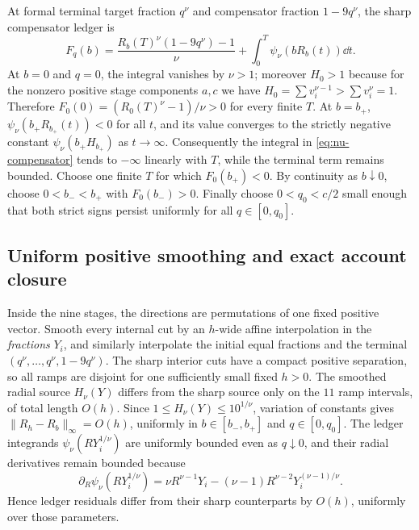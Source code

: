 \documentclass[review,hidelinks,onefignum,onetabnum]{siamonline250211}%
\begin{document}
At formal terminal target fraction $q^\nu$ and compensator
fraction $1-9q^\nu$, the sharp compensator ledger is
\begin{equation}\label{eq:nu-compensator}
 F_q(b)=\frac{R_b(T)^\nu(1-9q^\nu)-1}{\nu}
       +\int_0^T\psi_\nu(bR_b(t))\dd t.
\end{equation}
At $b=0$ and $q=0$, the integral vanishes by $\nu>1$;
moreover $H_0>1$ because for the nonzero positive stage
components $a,c$ we have
$H_0=\sum v_i^{\nu-1}>\sum v_i^\nu=1$.
Therefore $F_0(0)=(R_0(T)^\nu-1)/\nu>0$
for every finite $T$. At $b=b_+$,
$\psi_\nu(b_+R_{b_+}(t))<0$ for all $t$, and its value
converges to the strictly negative constant
$\psi_\nu(b_+H_{b_+})$ as $t\to\infty$. Consequently the
integral in \eqref{eq:nu-compensator} tends to $-\infty$
linearly with $T$, while the terminal term remains bounded.
Choose one finite $T$ for which $F_0(b_+)<0$.
By continuity as $b\downarrow0$, choose
$0<b_-<b_+$ with $F_0(b_-)>0$. Finally choose
$0<q_0<c/2$ small enough that both strict signs persist
uniformly for all $q\in[0,q_0]$.

\subsection{Uniform positive smoothing and exact account closure}
\label{app:general-smooth}
Inside the nine stages, the directions are permutations of
one fixed positive vector. Smooth every internal cut by
an $h$-wide affine interpolation in the \emph{fractions} $Y_i$,
and similarly interpolate the initial equal fractions and the
terminal $(q^\nu,\ldots,q^\nu,1-9q^\nu)$. The sharp
interior cuts have a compact positive separation, so all
ramps are disjoint for one sufficiently small fixed $h>0$.
The smoothed radial source $H_\nu(Y)$ differs from the sharp
source only on the $11$ ramp intervals, of total length
$O(h)$. Since $1\le H_\nu(Y)\le10^{1/\nu}$,
variation of constants gives
$\|R_h-R_b\|_\infty=O(h)$, uniformly in
$b\in[b_-,b_+]$ and $q\in[0,q_0]$.
The ledger integrands $\psi_\nu(RY_i^{1/\nu})$ are
uniformly bounded even as $q\downarrow0$, and their radial
derivatives remain bounded because
\[
 \partial_R\psi_\nu(RY_i^{1/\nu})
 =\nu R^{\nu-1}Y_i-(\nu-1)R^{\nu-2}
                         Y_i^{(\nu-1)/\nu}.
\]
Hence ledger residuals differ from their sharp counterparts
by $O(h)$, uniformly over those parameters.
\end{document}
